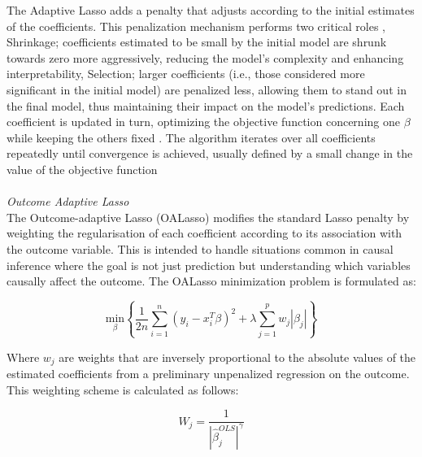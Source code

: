 \noindent The Adaptive Lasso adds a penalty that adjusts according to the initial estimates of the coefficients. This penalization mechanism performs two critical roles \parencite{zhang_adaptive_2007}, Shrinkage; coefficients estimated to be small by the initial model are shrunk towards zero more aggressively, reducing the model's complexity and enhancing interpretability, Selection; larger coefficients (i.e., those considered more significant in the initial model) are penalized less, allowing them to stand out in the final model, thus maintaining their impact on the model's predictions. Each coefficient is updated in turn, optimizing the objective function concerning one \(\beta\) while keeping the others fixed \parencite{zhang_adaptive_2007}. The algorithm iterates over all coefficients repeatedly until convergence is achieved, usually defined by a small change in the value of the objective function
\\\\
\textit{Outcome Adaptive Lasso}
\\
\noindent The Outcome-adaptive Lasso (OALasso) \parencite{shortreed_outcome-adaptive_2017} modifies the standard Lasso penalty by weighting the regularisation of each coefficient according to its association with the outcome variable. This is intended to handle situations common in causal inference where the goal is not just prediction but understanding which variables causally affect the outcome. The OALasso minimization \parencite{shortreed_outcome-adaptive_2017} problem is formulated as:

\begin{equation} \label{eq:oalasso}\underset{\beta}{\text{min}} \left\{ \frac{1}{2n} \sum_{i=1}^{n}(y_{i}-x_{i}^{T}\beta)^{2} + \lambda \sum_{j=1}^{p}w_{j}|\beta_{j}|\right\}\end{equation}

\noindent Where \(w_{j}\) are weights that are inversely proportional to the absolute values of the estimated coefficients from a preliminary unpenalized regression on the outcome. This weighting scheme is calculated as follows:

\begin{equation} \label{eq:oalssobound}W_{j} = \frac{1}{|\hat{\beta}_{j}^{OLS}|^{\gamma}}\end{equation}

